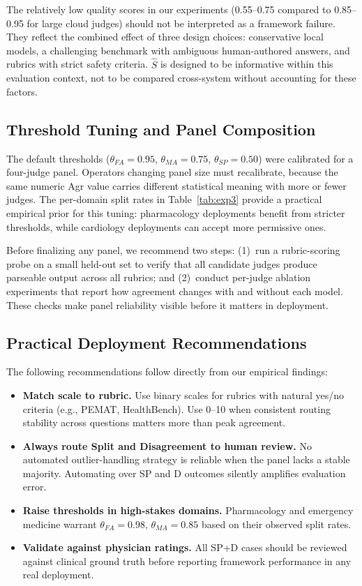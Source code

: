 \documentclass[conference]{IEEEtran}
\begin{document}
The relatively low quality scores in our experiments (0.55--0.75
compared to 0.85--0.95 for large cloud judges) should not be interpreted
as a framework failure. They reflect the combined effect of three design
choices: conservative local models, a challenging benchmark with
ambiguous human-authored answers, and rubrics with strict safety
criteria. $\hat{S}$ is designed to be informative within this evaluation
context, not to be compared cross-system without accounting for these factors.

\subsection{Threshold Tuning and Panel Composition}

The default thresholds ($\theta_{FA}=0.95$, $\theta_{MA}=0.75$,
$\theta_{SP}=0.50$) were calibrated for a four-judge panel. Operators
changing panel size must recalibrate, because the same numeric Agr
value carries different statistical meaning with more or fewer judges.
The per-domain split rates in Table~\ref{tab:exp3} provide a practical
empirical prior for this tuning: pharmacology deployments benefit from
stricter thresholds, while cardiology deployments can accept more
permissive ones.

Before finalizing any panel, we recommend two steps: (1)~run a
rubric-scoring probe on a small held-out set to verify that all
candidate judges produce parseable output across all rubrics; and
(2)~conduct per-judge ablation experiments that report how agreement
changes with and without each model. These checks make panel reliability
visible before it matters in deployment.

\subsection{Practical Deployment Recommendations}

The following recommendations follow directly from our empirical findings:

\begin{itemize}
  \item \textbf{Match scale to rubric.} Use binary scales for rubrics
        with natural yes/no criteria (e.g., PEMAT, HealthBench). Use
        0--10 when consistent routing stability across questions matters
        more than peak agreement.
  \item \textbf{Always route Split and Disagreement to human review.}
        No automated outlier-handling strategy is reliable when the
        panel lacks a stable majority. Automating over SP and D outcomes
        silently amplifies evaluation error.
  \item \textbf{Raise thresholds in high-stakes domains.} Pharmacology
        and emergency medicine warrant $\theta_{FA}=0.98$,
        $\theta_{MA}=0.85$ based on their observed split rates.
  \item \textbf{Validate against physician ratings.} All SP+D cases
        should be reviewed against clinical ground truth before
        reporting framework performance in any real deployment.
\end{itemize}
\end{document}
